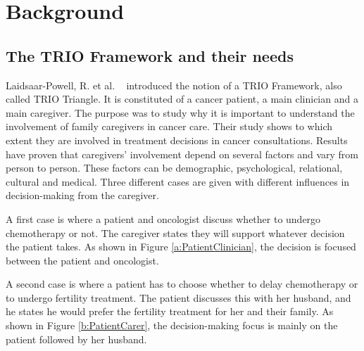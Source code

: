 \documentclass{sigchi}
\begin{document}
\section{Background}

\subsection{The TRIO Framework and their needs}

Laidsaar-Powell, R. et al. ~\cite{Laidsaar-Powell2017} introduced the notion of a TRIO Framework, also called TRIO Triangle. It is constituted of a cancer patient, a main clinician and a main caregiver. The purpose was to study why it is important to understand the involvement of family caregivers in cancer care. Their study shows to which extent they are involved in treatment decisions in cancer consultations. Results have proven that caregivers’ involvement depend on several factors and vary from person to person. These factors can be demographic, psychological, relational, cultural and medical. Three different cases are given with different influences in decision-making from the caregiver.

A first case is where a patient and oncologist discuss whether to undergo chemotherapy or not. The caregiver states they will support whatever decision the patient takes. As shown in Figure  \ref{a:PatientClinician}, the decision is focused between the patient and oncologist.

A second case is where a patient has to choose whether to delay chemotherapy or to undergo fertility treatment. The patient discusses this with her husband, and he states he would prefer the fertility treatment for her and their family. As shown in Figure \ref{b:PatientCarer}, the decision-making focus is mainly on the patient followed by her husband.

\raggedbottom

\end{document}
